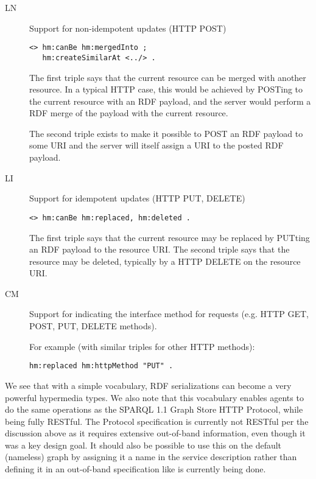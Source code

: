 \documentclass{llncs}
\begin{document}
\begin{description}

\item[\textsf{LN}] Support for non-idempotent updates (HTTP POST) 

\begin{verbatim}
<> hm:canBe hm:mergedInto ;
   hm:createSimilarAt <../> .
\end{verbatim}

The first triple says that the current resource can be merged with
another resource. In a typical HTTP case, this would be achieved by
POSTing to the current resource with an RDF payload, and the server
would perform a RDF merge of the payload with the current resource.

The second triple exists to make it possible to POST an RDF payload to
some URI and the server will itself assign a URI to the posted RDF
payload.

\item[\textsf{LI}] Support for idempotent updates (HTTP PUT, DELETE) 

\begin{verbatim}
<> hm:canBe hm:replaced, hm:deleted .
\end{verbatim}


The first triple says that the current resource may be replaced by
PUTting an RDF payload to the resource URI. The second triple says
that the resource may be deleted, typically by a HTTP DELETE on the
resource URI.


\item[\textsf{CM}] Support for indicating the interface method for requests
  (e.g. HTTP GET, POST, PUT, DELETE methods).

For example (with similar triples for other HTTP methods):
\begin{verbatim}
hm:replaced hm:httpMethod "PUT" .
\end{verbatim}

\end{description}

We see that with a simple vocabulary, RDF serializations can become a
very powerful hypermedia types. We also note that this vocabulary
enables agents to do the same operations as the SPARQL 1.1 Graph Store
HTTP Protocol\cite{graphstore}, while being fully RESTful. The
Protocol specification is currently not RESTful per the discussion
above as it requires extensive out-of-band information, even though it
was a key design goal. It should also be possible to use this on the
default (nameless) graph by assigning it a name in the service
description rather than defining it in an out-of-band specification
like is currently being done.
\end{document}
